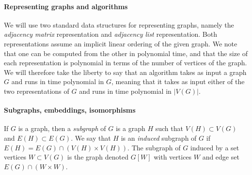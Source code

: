 \paragraph{Representing graphs and algorithms}
We will use two standard data structures for representing graphs,
namely the \emph{adjacency matrix} representation and \emph{adjacency list} representation. Both representations assume an implicit linear ordering of the given graph.
We note that one can be computed from the other in polynomial time, and that the size of each representation is polynomial in terms of the number of vertices of the graph.
We will therefore take the liberty to say that an algorithm 
takes as input a graph $G$ and runs in time polynomial in $G$,
meaning that it takes as input either of the two representations of $G$
and runs in time polynomial in $|V(G)|$. 


%
%
%
%
 





\paragraph{Subgraphs, embeddings, isomorphisms}
If $G$ is a graph, then a \emph{subgraph} of $G$
is a graph $H$ such that $V(H)\subset V(G)$
and $E(H)\subset E(G)$. We say that $H$
is an \emph{induced} subgraph of $G$
if $E(H)=E(G)\cap (V(H)\times V(H))$.
The subgraph of $G$ induced by a set vertices $W\subset V(G)$ is the graph denoted $G[W]$ with vertices $W$ and edge set $E(G)\cap (W\times W)$. 

